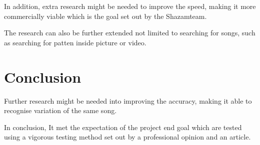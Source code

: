 In addition, extra research might be needed to improve the speed, making it more commercially viable which is the goal set out by the Shazam\trademark team. \cite{wang_systems_2013}

The research can also be further extended not limited to searching for songs, such as searching for patten inside picture or video.

\chapter{Conclusion}

Further research might be needed into improving the accuracy, making it able to recognise variation of the same song. \cite{yang_music_2001}

In conclusion, It met the expectation of the project end goal which are tested using a vigorous testing method set out by a professional opinion and an article. 
